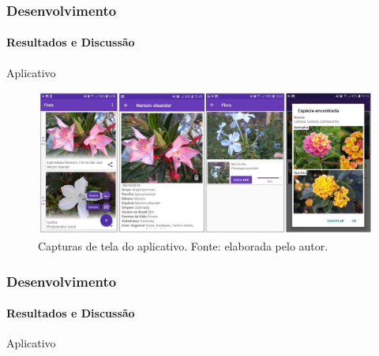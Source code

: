 \documentclass{beamer}
\begin{document}
	\begin{frame}[t]
    		\frametitle{Desenvolvimento}
    		\framesubtitle{Resultados e Discussão}		
		Aplicativo
		\begin{figure}[hbt]
      	 		\begin{center}
      			\includegraphics[height=.45 \textwidth]{img/print1.png}
      			\end{center}
      			\caption{Capturas de tela do aplicativo. Fonte: elaborada pelo autor.}
      			\end{figure}	
    \end{frame}  
    
    \begin{frame}[t]
    		\frametitle{Desenvolvimento}
    		\framesubtitle{Resultados e Discussão}		
		Aplicativo \medskip
		\begin{center}
		\end{center}
    \end{frame}
    
\end{document}
